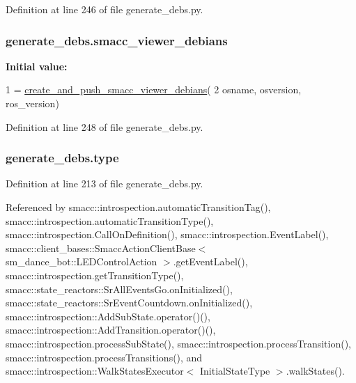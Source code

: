 Definition at line 246 of file generate\+\_\+debs.\+py.

\subsubsection[{\texorpdfstring{smacc\+\_\+viewer\+\_\+debians}{smacc_viewer_debians}}]{\setlength{\rightskip}{0pt plus 5cm}generate\+\_\+debs.\+smacc\+\_\+viewer\+\_\+debians}\hypertarget{namespacegenerate__debs_a545b249defac1bf82a09872513263f61}{}\label{namespacegenerate__debs_a545b249defac1bf82a09872513263f61}
{\bfseries Initial value\+:}
\begin{DoxyCode}
1 = \hyperlink{namespacegenerate__debs_a9a6167ed98fbdc7b1e1c56da5652cf19}{create\_and\_push\_smacc\_viewer\_debians}(
2         osname, osversion, ros\_version)
\end{DoxyCode}


Definition at line 248 of file generate\+\_\+debs.\+py.

\subsubsection[{\texorpdfstring{type}{type}}]{\setlength{\rightskip}{0pt plus 5cm}generate\+\_\+debs.\+type}\hypertarget{namespacegenerate__debs_a50bc9a7ecac9584553e089a448bcde58}{}\label{namespacegenerate__debs_a50bc9a7ecac9584553e089a448bcde58}


Definition at line 213 of file generate\+\_\+debs.\+py.



Referenced by smacc\+::introspection.\+automatic\+Transition\+Tag(), smacc\+::introspection.\+automatic\+Transition\+Type(), smacc\+::introspection.\+Call\+On\+Definition(), smacc\+::introspection.\+Event\+Label(), smacc\+::client\+\_\+bases\+::\+Smacc\+Action\+Client\+Base$<$ sm\+\_\+dance\+\_\+bot\+::\+L\+E\+D\+Control\+Action $>$.\+get\+Event\+Label(), smacc\+::introspection.\+get\+Transition\+Type(), smacc\+::state\+\_\+reactors\+::\+Sr\+All\+Events\+Go.\+on\+Initialized(), smacc\+::state\+\_\+reactors\+::\+Sr\+Event\+Countdown.\+on\+Initialized(), smacc\+::introspection\+::\+Add\+Sub\+State.\+operator()(), smacc\+::introspection\+::\+Add\+Transition.\+operator()(), smacc\+::introspection.\+process\+Sub\+State(), smacc\+::introspection.\+process\+Transition(), smacc\+::introspection.\+process\+Transitions(), and smacc\+::introspection\+::\+Walk\+States\+Executor$<$ Initial\+State\+Type $>$.\+walk\+States().


